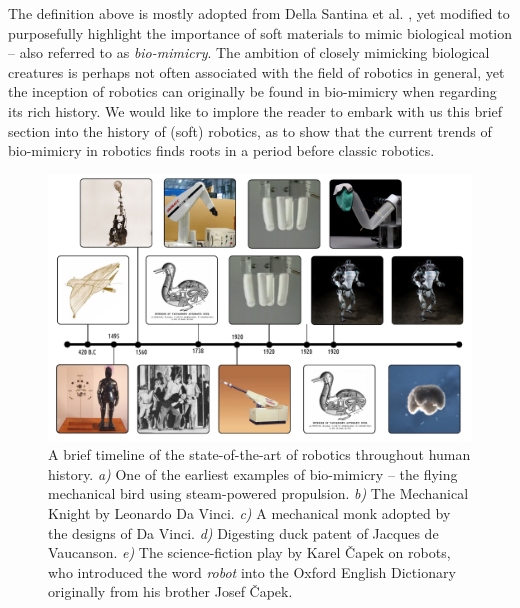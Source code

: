 The definition above is mostly adopted from Della Santina et al. \cite{}, yet modified to purposefully highlight the importance of soft materials to mimic biological motion -- also referred to as \emph{bio-mimicry}. The ambition of closely mimicking biological creatures is perhaps not often associated with the field of robotics in general, yet the inception of robotics can originally be found in bio-mimicry when regarding its rich history. We would like to implore the reader to embark with us this brief section into the history of (soft) robotics, as to show that the current trends of bio-mimicry in robotics finds roots in a period before classic robotics.
%
\begin{figure}
\hspace{-7mm}
\includegraphics[width=1.11\textwidth]{./3_chapters/0_introduction/img/timeline.pdf}
\caption{A brief timeline of the state-of-the-art of robotics throughout human history. \textit{a)} One of the earliest examples of bio-mimicry -- the flying mechanical bird using steam-powered propulsion. \textit{b)} The Mechanical Knight by Leonardo Da Vinci. \textit{c)} A mechanical monk adopted by the designs of Da Vinci. \textit{d)} Digesting duck patent of Jacques de Vaucanson. \textit{e)} The science-fiction play by Karel \v{C}apek on robots, who introduced the word \emph{robot} into the Oxford English Dictionary originally from his brother Josef \v{C}apek.}
\end{figure}

